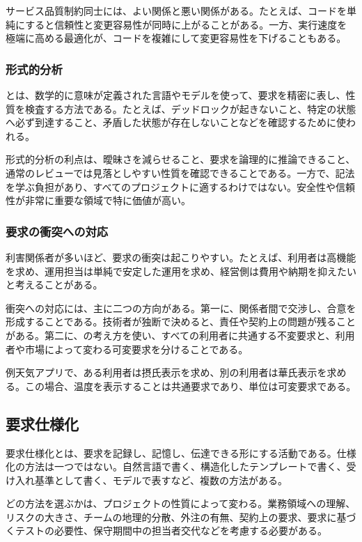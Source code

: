 \documentclass[a4paper,11pt]{ltjsarticle}
\numberwithin{figure}{section}
\numberwithin{table}{section}
\newcommand{\MiniBox}[2]{\par\smallskip\begin{statementbox}{#1}#2\end{statementbox}\par\smallskip}
\begin{document}
サービス品質制約同士には、よい関係と悪い関係がある。たとえば、コードを単純にすると信頼性と変更容易性が同時に上がることがある。一方、実行速度を極端に高める最適化が、コードを複雑にして変更容易性を下げることもある。

\subsubsection{形式的分析}

とは、数学的に意味が定義された言語やモデルを使って、要求を精密に表し、性質を検査する方法である。たとえば、デッドロックが起きないこと、特定の状態へ必ず到達すること、矛盾した状態が存在しないことなどを確認するために使われる。

形式的分析の利点は、曖昧さを減らせること、要求を論理的に推論できること、通常のレビューでは見落としやすい性質を確認できることである。一方で、記法を学ぶ負担があり、すべてのプロジェクトに適するわけではない。安全性や信頼性が非常に重要な領域で特に価値が高い。

\subsubsection{要求の衝突への対応}

利害関係者が多いほど、要求の衝突は起こりやすい。たとえば、利用者は高機能を求め、運用担当は単純で安定した運用を求め、経営側は費用や納期を抑えたいと考えることがある。

衝突への対応には、主に二つの方向がある。第一に、関係者間で交渉し、合意を形成することである。技術者が独断で決めると、責任や契約上の問題が残ることがある。第二に、の考え方を使い、すべての利用者に共通する不変要求と、利用者や市場によって変わる可変要求を分けることである。

\MiniBox{例}{天気アプリで、ある利用者は摂氏表示を求め、別の利用者は華氏表示を求める。この場合、温度を表示することは共通要求であり、単位は可変要求である。}

\subsection{要求仕様化}

要求仕様化とは、要求を記録し、記憶し、伝達できる形にする活動である。仕様化の方法は一つではない。自然言語で書く、構造化したテンプレートで書く、受け入れ基準として書く、モデルで表すなど、複数の方法がある。

どの方法を選ぶかは、プロジェクトの性質によって変わる。業務領域への理解、リスクの大きさ、チームの地理的分散、外注の有無、契約上の要求、要求に基づくテストの必要性、保守期間中の担当者交代などを考慮する必要がある。
\end{document}
